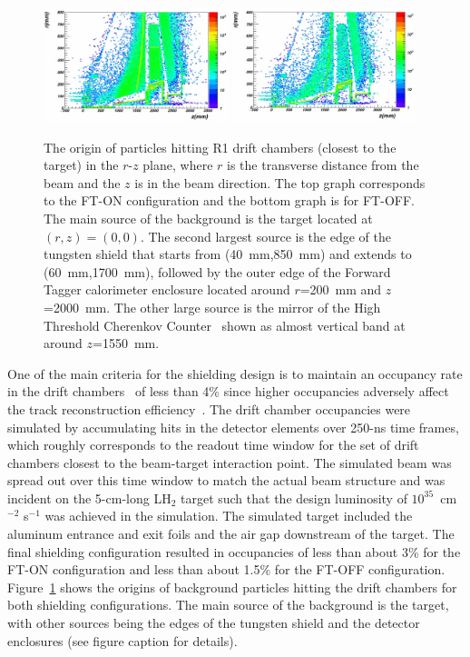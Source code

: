 \begin{figure}[t]
\begin{center}
\includegraphics[width=0.48\textwidth]{fton_final_origin.pdf}
\includegraphics[width=0.48\textwidth]{ftoff_final_origin.pdf}
\caption{The origin of particles hitting R1 drift chambers (closest to the target) in the $r$-$z$ plane, where $r$
  is the transverse distance from the beam and the $z$ is in the beam direction. The top graph corresponds to the
  FT-ON configuration and the bottom graph is for FT-OFF. The main source of the background is the target located
  at $(r,z)=(0,0)$. The second largest source is the edge of the tungsten shield that starts from (40~mm,850~mm)
  and extends to (60~mm,1700~mm), followed by the outer edge of the Forward Tagger calorimeter enclosure located
  around $r$=200~mm and $z$=2000~mm. The other large source is the mirror of the High Threshold Cherenkov
  Counter~\cite{htcc-nim} shown as almost vertical band at around $z$=1550~mm.}
\label{fig:origin}
\end{center}
\end{figure}

One of the main criteria for the shielding design is to maintain an occupancy rate in the drift chambers~\cite{dc-nim}
of less than 4\% since higher occupancies adversely affect the track reconstruction efficiency~\cite{recon-nim}.
The drift chamber occupancies were simulated by accumulating hits in the detector elements over 250-ns time
frames, which roughly corresponds to the readout time window for the set of drift chambers closest to the
beam-target interaction point. The simulated beam was spread out over this time window to match the actual beam
structure and was incident on the 5-cm-long LH$_2$ target such that the design luminosity of
$10^{35}$~cm$^{-2}$ s$^{-1}$ was achieved in the simulation. The simulated target included the aluminum entrance
and exit foils and the air gap downstream of the target. The final shielding configuration resulted in occupancies of
less than about 3\% for the FT-ON configuration and less than about 1.5\% for the FT-OFF configuration.
Figure~\ref{fig:origin} shows the origins of background particles hitting the drift chambers for both shielding
configurations. The main source of the background is the target, with other sources being the edges of the
tungsten shield and the detector enclosures (see figure caption for details). 

